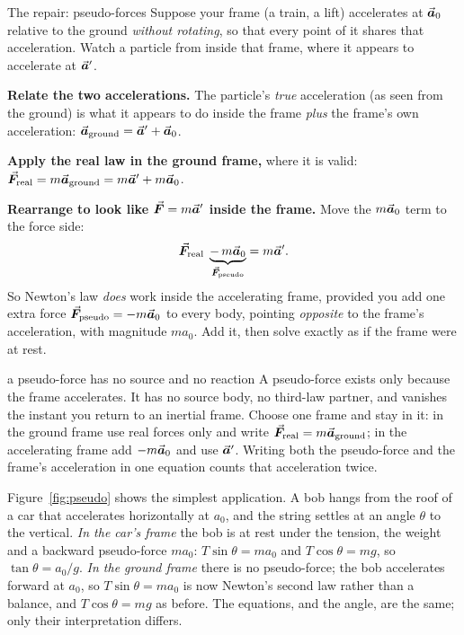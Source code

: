 \begin{derivbox}{The repair: pseudo-forces}
Suppose your frame (a train, a lift) accelerates at $\vec{\bm{a}}_0$ relative to the ground \emph{without
rotating}, so that every point of it shares that acceleration. Watch a particle from
inside that frame, where it appears to accelerate at $\vec{\bm{a}}'$.

 \textbf{Relate the two accelerations.} The particle's \emph{true} acceleration (as seen from the
ground) is what it appears to do inside the frame \emph{plus} the frame's own acceleration:
$\vec{\bm{a}}_{\text{ground}}=\vec{\bm{a}}'+\vec{\bm{a}}_0$.

 \textbf{Apply the real law in the ground frame,} where it is valid:
$\vec{\bm{F}}_{\text{real}}=m\vec{\bm{a}}_{\text{ground}}=m\vec{\bm{a}}'+m\vec{\bm{a}}_0$.

 \textbf{Rearrange to look like $\vec{\bm{F}}=m\vec{\bm{a}}'$ inside the frame.} Move the $m\vec{\bm{a}}_0$ term to the
force side:
\[
\vec{\bm{F}}_{\text{real}}\;\underbrace{-\,m\vec{\bm{a}}_0}_{\vec{\bm{F}}_{\text{pseudo}}}=m\vec{\bm{a}}'.
\]
So Newton's law \emph{does} work inside the accelerating frame, provided you add one extra force
$\vec{\bm{F}}_{\text{pseudo}}=-m\vec{\bm{a}}_0$ to every body, pointing \emph{opposite} to the frame's acceleration, with
magnitude $m a_0$. Add it, then solve exactly as if the frame were at rest.
\end{derivbox}

\begin{trapbox}{a pseudo-force has no source and no reaction}
A pseudo-force exists only because the frame accelerates. It has no source body, no third-law partner,
and vanishes the instant you return to an inertial frame. Choose one frame and stay in it: in the
ground frame use real forces only and write $\vec{\bm{F}}_{\text{real}}=m\vec{\bm{a}}_{\text{ground}}$; in the accelerating
frame add $-m\vec{\bm{a}}_0$ and use $\vec{\bm{a}}'$. Writing both the pseudo-force and the frame's acceleration in one
equation counts that acceleration twice.
\end{trapbox}

\begin{figure}[htbp]
\centering
{}
\end{figure}

Figure~\ref{fig:pseudo} shows the simplest application. A bob hangs from the roof of a car that
accelerates horizontally at $a_0$, and the string settles at an angle $\theta$ to the vertical.
\emph{In the car's frame} the bob is at rest under the tension, the weight and a backward pseudo-force
$ma_0$: $T\sin\theta=ma_0$ and $T\cos\theta=mg$, so $\tan\theta=a_0/g$. \emph{In the ground frame}
there is no pseudo-force; the bob accelerates forward at $a_0$, so $T\sin\theta=ma_0$ is now Newton's
second law rather than a balance, and $T\cos\theta=mg$ as before. The equations, and the angle, are the
same; only their interpretation differs.

